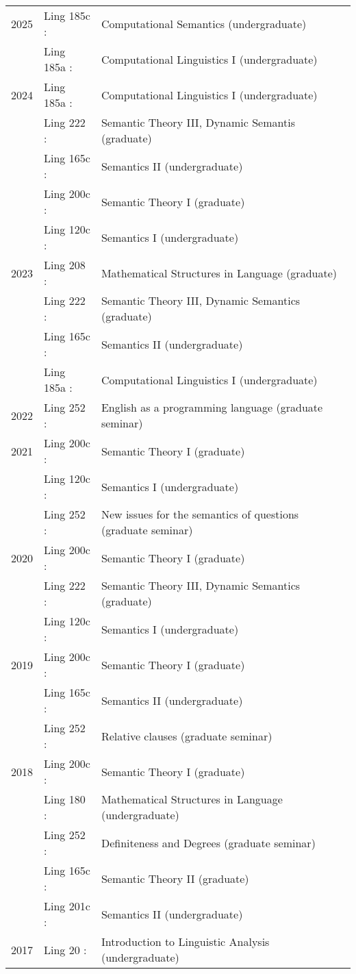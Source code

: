 \documentclass[12pt]{article}
\renewcommand{\arraystretch}{1.25} %
\begin{document}
\begingroup
\renewcommand{\arraystretch}{1} %
\begin{longtable}{L@{}>{\lfstyle}p{0.11\textwidth}<{:}@{}p{0.78\textwidth}@{}}
  2025 & Ling 185c & Computational Semantics (undergraduate)\\
       & Ling 185a & Computational Linguistics I (undergraduate)
  \\[1ex]
  2024 & Ling 185a & Computational Linguistics I (undergraduate)\\
       & Ling 222  & Semantic Theory III, Dynamic Semantis (graduate)\\
       & Ling 165c & Semantics II (undergraduate)\\
       & Ling 200c & Semantic Theory I (graduate)\\
       & Ling 120c & Semantics I (undergraduate)
  \\[1ex]
  2023 & Ling 208  & Mathematical Structures in Language (graduate)\\
       & Ling 222  & Semantic Theory III, Dynamic Semantics (graduate)\\
       & Ling 165c & Semantics II (undergraduate)\\
       & Ling 185a & Computational Linguistics I (undergraduate)
  \\[1ex]
  2022 & Ling 252  & English as a programming language (graduate seminar)
  \\[1ex]
  2021 & Ling 200c & Semantic Theory I (graduate)\\
       & Ling 120c & Semantics I (undergraduate)\\
       & Ling 252  & New issues for the semantics of questions (graduate seminar)
  \\[1ex]
  2020 & Ling 200c & Semantic Theory I (graduate)\\
       & Ling 222  & Semantic Theory III, Dynamic Semantics (graduate)\\
       & Ling 120c & Semantics I (undergraduate)
  \\[1ex]
  2019 & Ling 200c & Semantic Theory I (graduate)\\
       & Ling 165c & Semantics II (undergraduate)\\
       & Ling 252  & Relative clauses (graduate seminar)
  \\[1ex]
  2018 & Ling 200c & Semantic Theory I (graduate)\\
       & Ling 180  & Mathematical Structures in Language (undergraduate)\\
       & Ling 252  & Definiteness and Degrees (graduate seminar)\\
       & Ling 165c & Semantic Theory II (graduate)\\
       & Ling 201c & Semantics II (undergraduate)
  \\[1ex]
  2017 & Ling 20   & Introduction to Linguistic Analysis (undergraduate)
\end{longtable}
\endgroup
\end{document}
